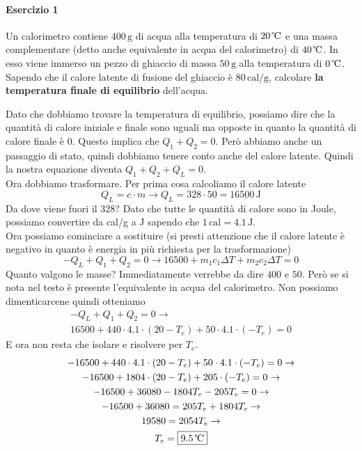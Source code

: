 \paragraph{Esercizio 1}
Un calorimetro contiene  $400\,\text{g}$ di acqua alla temperatura di $20\,\text{\textcelsius}$ e una 
massa complementare (detto anche equivalente in acqua del calorimetro) di $40\,\text{\textcelsius}$. 
In esso viene immerso un pezzo di ghiaccio di massa $50\,\text{g}$ alla temperatura di 
$0\,\text{\textcelsius}$. Sapendo che il calore latente di fusione del ghiaccio è $80\,\text{cal/g}$, 
calcolare \textbf{la temperatura finale di equilibrio} dell'acqua.
\divisor

Dato che dobbiamo trovare la temperatura di equilibrio, possiamo dire che la quantità di calore 
iniziale e finale sono uguali ma opposte in quanto la quantità di calore finale è $0$. Questo implica 
che $Q_1 + Q_2 = 0$. Però abbiamo anche un passaggio di stato, quindi dobbiamo tenere conto anche del
calore latente. Quindi la nostra equazione diventa $Q_1 + Q_2 + Q_L = 0$.\\[\baselineskip]
Ora dobbiamo trasformare. Per prima cosa calcoliamo il calore latente
\begin{equation*}
Q_L = c\cdot m \rightarrow Q_L = 328\cdot50 = \underline{16500\,\text{J}}
\end{equation*}
Da dove viene fuori il $328$? Dato che tutte le quantità di calore sono in Joule, possiamo convertire
da cal/g a J sapendo che $1\,\text{cal} = 4.1\,\text{J}$.\\[\baselineskip]
Ora possiamo cominciare a sostituire (si presti attenzione che il calore latente è negativo in quanto
è energia in più richiesta per la trasformazione)
\begin{equation*}
-Q_L + Q_1 + Q_2 = 0 \rightarrow 16500 + m_1c_1\Delta T + m_2c_2\Delta T = 0
\end{equation*}
Quanto valgono le masse? Immediatamente verrebbe da dire $400$ e $50$. Però se si nota nel testo è
presente l'equivalente in acqua del calorimetro. Non possiamo dimenticarcene quindi otteniamo
\begin{gather*}
-Q_L + Q_1 + Q_2 = 0 \rightarrow \\
16500 + 440\cdot4.1\cdot(20-T_e)+50\cdot4.1\cdot(-T_e) = 0
\end{gather*}
E ora non resta che isolare e risolvere per $T_e$.
\begin{gather*}
-16500 + 440\cdot4.1\cdot(20-T_e)+50\cdot4.1\cdot(-T_e) = 0 \rightarrow \\
-16500 + 1804\cdot(20-T_e)+205\cdot(-T_e) = 0 \rightarrow\\
-16500 + 36080 - 1804T_e - 205T_e = 0 \rightarrow\\
-16500 + 36080 = 205T_e + 1804T_e \rightarrow\\
19580 = 2054T_e \rightarrow\\
T_e = \boxed{9.5\,\text{\textcelsius}}
\end{gather*}

